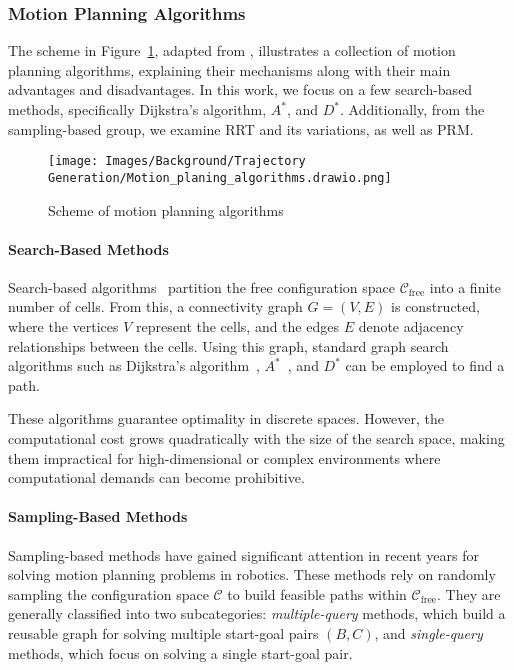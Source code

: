 \subsubsection{Motion Planning Algorithms}

The scheme in Figure~\ref{fig:background:trajectory generation:motion planning algorithms}, adapted from \cite{InesBatista2022Thesis}, illustrates a collection of motion planning algorithms, explaining their mechanisms along with their main advantages and disadvantages. In this work, we focus on a few search-based methods, specifically Dijkstra’s algorithm, $A^{*}$, and $D^{*}$. Additionally, from the sampling-based group, we examine RRT and its variations, as well as PRM.

\begin{figure}[H]
    \centering
    \texttt{[image: Images/Background/Trajectory Generation/Motion\_planing\_algorithms.drawio.png]}
    \caption{Scheme of motion planning algorithms~\cite{InesBatista2022Thesis}}
    \label{fig:background:trajectory generation:motion planning algorithms}
\end{figure}

\paragraph{Search-Based Methods}

Search-based algorithms~\cite{latombe2012robot} partition the free configuration space $\mathcal{C}_{\text{free}}$ into a finite number of cells. From this, a connectivity graph $G = (V, E)$ is constructed, where the vertices $V$ represent the cells, and the edges $E$ denote adjacency relationships between the cells. Using this graph, standard graph search algorithms such as Dijkstra’s algorithm~\cite{dijkstra2022note}, $A^{*}$~\cite{A-start-original}, and $D^{*}$ can be employed to find a path.

These algorithms guarantee optimality in discrete spaces. However, the computational cost grows quadratically with the size of the search space, making them impractical for high-dimensional or complex environments where computational demands can become prohibitive.

\paragraph{Sampling-Based Methods}

Sampling-based methods have gained significant attention in recent years for solving motion planning problems in robotics. These methods rely on randomly sampling the configuration space $\mathcal{C}$ to build feasible paths within $\mathcal{C}_{\text{free}}$. They are generally classified into two subcategories: \textit{multiple-query} methods, which build a reusable graph for solving multiple start-goal pairs $(B, C)$, and \textit{single-query} methods, which focus on solving a single start-goal pair.

